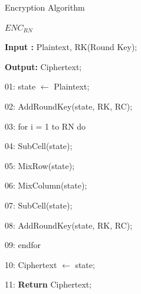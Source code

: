 \documentclass[preprint]{transcrypto}
\begin{document}
\begin{algorithm}[H]
    \caption{Encryption Algorithm}
    \label{alg:algorithm-label}
    \begin{algorithmic}
        \item $ENC_{RN}$
        \item \textbf{Input :} Plaintext, RK(Round Key);
        \item \textbf{Output: } Ciphertext;
        \item 01: state $\leftarrow$ Plaintext;
        \item 02: AddRoundKey(state, RK, RC);
        \item 03: for i = 1 to RN do
        \item 04: \qquad SubCell(state);
        \item 05: \qquad MixRow(state);
        \item 06: \qquad MixColumn(state);
        \item 07: \qquad SubCell(state);
        \item 08: \qquad AddRoundKey(state, RK, RC);
        \item 09: endfor
        \item 10: Ciphertext $\leftarrow$ state;
        \item 11: \textbf{Return} Ciphertext;
    \end{algorithmic}
    \label{alg:encryption}
\end{algorithm}
\end{document}

